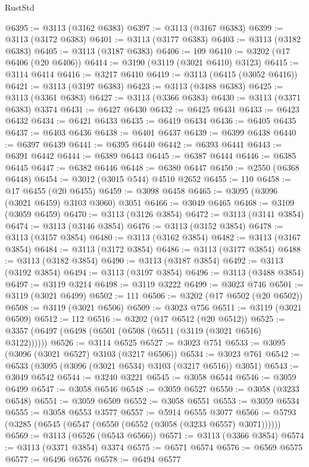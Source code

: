 \begin{lexlean}{RustStd}
\begin{coremodule}
@6395 := @3113 (@3162 @6383)
@6397 := @3113 (@3167 @6383)
@6399 := @3113 (@3172 @6383)
@6401 := @3113 (@3177 @6383)
@6403 := @3113 (@3182 @6383)
@6405 := @3113 (@3187 @6383)
@6406 := 109
@6410 := @3202 (@17 @6406 (@20 @6406))
@6414 := @3190 (@3119 (@3021 @6410) @3123)
@6415 := @3114 @6414
@6416 := @3217 @6410
@6419 := @3113 (@6415 (@3052 @6416))
@6421 := @3113 (@3197 @6383)
@6423 := @3113 (@3488 @6383)
@6425 := @3113 (@3361 @6383)
@6427 := @3113 (@3366 @6383)
@6430 := @3113 (@3371 @6383) @3374
@6431 := @6427 @6430
@6432 := @6425 @6431
@6433 := @6423 @6432
@6434 := @6421 @6433
@6435 := @6419 @6434
@6436 := @6405 @6435
@6437 := @6403 @6436
@6438 := @6401 @6437
@6439 := @6399 @6438
@6440 := @6397 @6439
@6441 := @6395 @6440
@6442 := @6393 @6441
@6443 := @6391 @6442
@6444 := @6389 @6443
@6445 := @6387 @6444
@6446 := @6385 @6445
@6447 := @6382 @6446
@6448 := @6380 @6447
@6450 := @2550 (@6368 @6448)
@6454 := @3012 (@3015 @544) @4510 @2652
@6455 := 110
@6458 := @17 @6455 (@20 @6455)
@6459 := @3098 @6458
@6465 := @3095 (@3096 (@3021 @6459) @3103 @3060) @3051
@6466 := @3049 @6465
@6468 := @3109 (@3059 @6459)
@6470 := @3113 (@3126 @3854)
@6472 := @3113 (@3141 @3854)
@6474 := @3113 (@3146 @3854)
@6476 := @3113 (@3152 @3854)
@6478 := @3113 (@3157 @3854)
@6480 := @3113 (@3162 @3854)
@6482 := @3113 (@3167 @3854)
@6484 := @3113 (@3172 @3854)
@6486 := @3113 (@3177 @3854)
@6488 := @3113 (@3182 @3854)
@6490 := @3113 (@3187 @3854)
@6492 := @3113 (@3192 @3854)
@6494 := @3113 (@3197 @3854)
@6496 := @3113 (@3488 @3854)
@6497 := @3119 @3214
@6498 := @3119 @3222
@6499 := @3023 @746
@6501 := @3119 (@3021 @6499)
@6502 := 111
@6506 := @3202 (@17 @6502 (@20 @6502))
@6508 := @3119 (@3021 @6506)
@6509 := @3023 @756
@6511 := @3119 (@3021 @6509)
@6512 := 112
@6516 := @3202 (@17 @6512 (@20 @6512))
@6525 := @3357 (@6497 (@6498 (@6501 (@6508 (@6511 (@3119 (@3021 @6516) @3122))))))
@6526 := @3114 @6525
@6527 := @3023 @751
@6533 := @3095 (@3096 (@3021 @6527) @3103 (@3217 @6506))
@6534 := @3023 @761
@6542 := @6533 (@3095 (@3096 (@3021 @6534) @3103 (@3217 @6516)) @3051)
@6543 := @3049 @6542
@6544 := @3240 @3221
@6545 := @3058 @6544
@6546 := @3059 @6499
@6547 := @3058 @6546
@6548 := @3059 @6527
@6550 := @3058 (@3233 @6548)
@6551 := @3059 @6509
@6552 := @3058 @6551
@6553 := @3059 @6534
@6555 := @3058 @6553 @3577
@6557 := @5914 @6555 @3077
@6566 := @5793 (@3285 (@6545 (@6547 (@6550 (@6552 (@3058 (@3233 @6557) @3071))))))
@6569 := @3113 (@6526 (@6543 @6566))
@6571 := @3113 (@3366 @3854)
@6574 := @3113 (@3371 @3854) @3374
@6575 := @6571 @6574
@6576 := @6569 @6575
@6577 := @6496 @6576
@6578 := @6494 @6577

\end{coremodule}
\end{lexlean}
